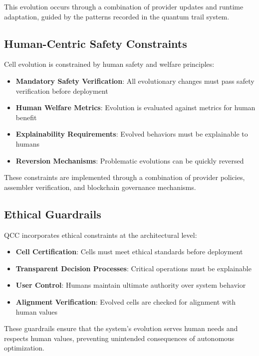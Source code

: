 \documentclass[11pt,a4paper]{article}
\begin{document}
This evolution occurs through a combination of provider updates and runtime adaptation, guided by the patterns recorded in the quantum trail system.

\subsection{Human-Centric Safety Constraints}

Cell evolution is constrained by human safety and welfare principles:

\begin{itemize}
    \item \textbf{Mandatory Safety Verification}: All evolutionary changes must pass safety verification before deployment
    \item \textbf{Human Welfare Metrics}: Evolution is evaluated against metrics for human benefit
    \item \textbf{Explainability Requirements}: Evolved behaviors must be explainable to humans
    \item \textbf{Reversion Mechanisms}: Problematic evolutions can be quickly reversed
\end{itemize}

These constraints are implemented through a combination of provider policies, assembler verification, and blockchain governance mechanisms.

\subsection{Ethical Guardrails}

QCC incorporates ethical constraints at the architectural level:

\begin{itemize}
    \item \textbf{Cell Certification}: Cells must meet ethical standards before deployment
    \item \textbf{Transparent Decision Processes}: Critical operations must be explainable
    \item \textbf{User Control}: Humans maintain ultimate authority over system behavior
    \item \textbf{Alignment Verification}: Evolved cells are checked for alignment with human values
\end{itemize}

These guardrails ensure that the system's evolution serves human needs and respects human values, preventing unintended consequences of autonomous optimization.
\end{document}
